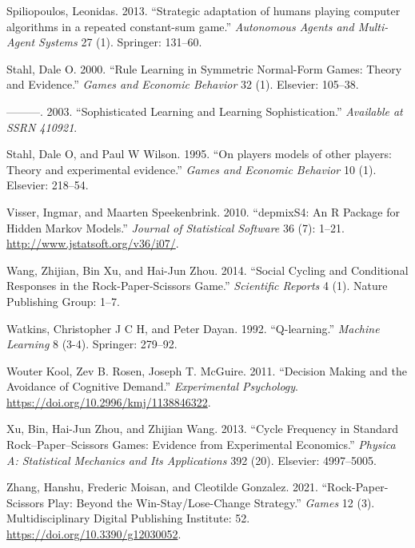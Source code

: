 \documentclass[smallextended]{svjour3}       %
\begin{document}
\leavevmode\hypertarget{ref-spiliopoulos2013strategic}{}%
Spiliopoulos, Leonidas. 2013. ``Strategic adaptation of humans playing
computer algorithms in a repeated constant-sum game.'' \emph{Autonomous
Agents and Multi-Agent Systems} 27 (1). Springer: 131--60.

\leavevmode\hypertarget{ref-stahl2000rule}{}%
Stahl, Dale O. 2000. ``Rule Learning in Symmetric Normal-Form Games:
Theory and Evidence.'' \emph{Games and Economic Behavior} 32 (1).
Elsevier: 105--38.

\leavevmode\hypertarget{ref-stahl2003sophisticated}{}%
---------. 2003. ``Sophisticated Learning and Learning Sophistication.''
\emph{Available at SSRN 410921}.

\leavevmode\hypertarget{ref-stahl1995players}{}%
Stahl, Dale O, and Paul W Wilson. 1995. ``On players models of other
players: Theory and experimental evidence.'' \emph{Games and Economic
Behavior} 10 (1). Elsevier: 218--54.

\leavevmode\hypertarget{ref-R-depmixS4}{}%
Visser, Ingmar, and Maarten Speekenbrink. 2010. ``depmixS4: An R Package
for Hidden Markov Models.'' \emph{Journal of Statistical Software} 36
(7): 1--21. \url{http://www.jstatsoft.org/v36/i07/}.

\leavevmode\hypertarget{ref-wang2014social}{}%
Wang, Zhijian, Bin Xu, and Hai-Jun Zhou. 2014. ``Social Cycling and
Conditional Responses in the Rock-Paper-Scissors Game.''
\emph{Scientific Reports} 4 (1). Nature Publishing Group: 1--7.

\leavevmode\hypertarget{ref-watkins1992q}{}%
Watkins, Christopher J C H, and Peter Dayan. 1992. ``Q-learning.''
\emph{Machine Learning} 8 (3-4). Springer: 279--92.

\leavevmode\hypertarget{ref-Kool_2011}{}%
Wouter Kool, Zev B. Rosen, Joseph T. McGuire. 2011. ``Decision Making
and the Avoidance of Cognitive Demand.'' \emph{Experimental Psychology}.
\url{https://doi.org/10.2996/kmj/1138846322}.

\leavevmode\hypertarget{ref-xu2013cycle}{}%
Xu, Bin, Hai-Jun Zhou, and Zhijian Wang. 2013. ``Cycle Frequency in
Standard Rock--Paper--Scissors Games: Evidence from Experimental
Economics.'' \emph{Physica A: Statistical Mechanics and Its
Applications} 392 (20). Elsevier: 4997--5005.

\leavevmode\hypertarget{ref-zhang_rock-paper-scissors_2021}{}%
Zhang, Hanshu, Frederic Moisan, and Cleotilde Gonzalez. 2021.
``Rock-Paper-Scissors Play: Beyond the Win-Stay/Lose-Change Strategy.''
\emph{Games} 12 (3). Multidisciplinary Digital Publishing Institute: 52.
\url{https://doi.org/10.3390/g12030052}.




\end{document}
